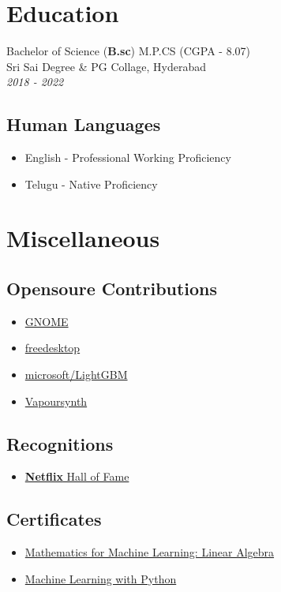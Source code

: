 \documentclass{article}
\begin{document}
\section{Education}
Bachelor of Science (\textbf{B.sc}) M.P.CS (CGPA - 8.07) \\
Sri Sai Degree \& PG Collage, Hyderabad \\
\emph{2018 - 2022}

\subsection{Human Languages}
\begin{itemize}
	\item English - Professional Working Proficiency
	\item Telugu - Native Proficiency
\end{itemize}


\section{Miscellaneous}


 \subsection{Opensoure Contributions}
 \begin{multicols}{2}
 \begin{itemize}
     \item \href{https://gitlab.gnome.org/jkotra}{GNOME}
     \item \href{https://gitlab.freedesktop.org/jkotra}{freedesktop}
     \item \href{https://github.com/microsoft/LightGBM}{microsoft/LightGBM}
     \item \href{https://github.com/vapoursynth/vapoursynth}{Vapoursynth}
 \end{itemize}
\end{multicols}

\subsection{Recognitions}

\begin{itemize}
    \item \href{https://bugcrowd.com/netflix/hall-of-fame}{\textbf{Netflix} Hall of Fame}
\end{itemize}


\subsection{Certificates}

\begin{itemize}
    \item \href{https://www.coursera.org/account/accomplishments/certificate/E2FE7HNXWP8J}{Mathematics for Machine Learning: Linear Algebra}
    \item \href{https://www.coursera.org/account/accomplishments/certificate/QDPTGAQSXZNM}{Machine Learning with Python}
\end{itemize}
\end{document}
